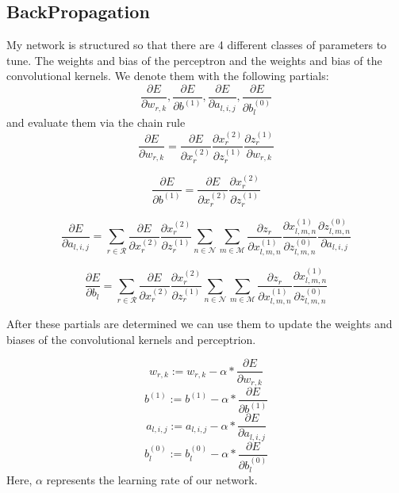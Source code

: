 \documentclass{article}
\begin{document}
\subsection{BackPropagation}
My network is structured so that there are 4 different classes of parameters to tune.  The weights and bias of the perceptron and the weights and bias of the convolutional kernels.  We denote them with the following partials:
\begin{equation}
\frac{\partial E}{\partial w_{r,k}},
\frac{\partial E}{\partial b^{(1)}},
\frac{\partial E}{\partial a_{l,i,j}},
\frac{\partial E}{\partial b^{(0)}_{l}}
\end{equation} 
and evaluate them via the chain rule
\begin{equation}
\frac{\partial E}{\partial w_{r,k}} =
\frac{\partial E}{\partial x_{r}^{(2)}}
\frac{\partial x^{(2)}_{r}}{\partial z_{r}^{(1)}}
\frac{\partial z_{r}^{(1)}}{\partial w_{r,k}}
\end{equation}

\begin{equation}
\frac{\partial E}{\partial b^{(1)}} =
\frac{\partial E}{\partial x_{r}^{(2)}}
\frac{\partial x^{(2)}_{r}}{\partial z_{r}^{(1)}}
\end{equation}

\begin{equation}
\frac{\partial E}{\partial a_{l,i,j}} = 
\sum_{r\in \mathcal{R}}
\frac{\partial E}{\partial x_{r}^{(2)}}
\frac{\partial x_{r}^{(2)}}{\partial z_{r}^{(1)}}
\sum_{n\in \mathcal{N}}
\sum_{m\in \mathcal{M}}
\frac{\partial z_{r}}{\partial x^{(1)}_{l,m,n}}
\frac{\partial x^{(1)}_{l,m,n}}{\partial z^{(0)}_{l,m,n}}
\frac{\partial z_{l,m,n}^{(0)}}{ \partial a_{l,i,j}}
\end{equation}

\begin{equation}
\frac{\partial E}{\partial b_{l}} = 
\sum_{r\in \mathcal{R}}
\frac{\partial E}{\partial x_{r}^{(2)}}
\frac{\partial x_{r}^{(2)}}{\partial z_{r}^{(1)}}
\sum_{n\in \mathcal{N}}
\sum_{m\in \mathcal{M}}
\frac{\partial z_{r}}{\partial x^{(1)}_{l,m,n}}
\frac{\partial x^{(1)}_{l,m,n}}{\partial z^{(0)}_{l,m,n}}
\end{equation}

After these partials are determined we can use them to update the weights and biases of the convolutional kernels and perceptrion. 

\begin{equation}
w_{r,k} := w_{r,k}- \alpha * \frac{\partial E}{\partial w_{r,k}}
\end{equation}
\begin{equation}
b^{(1)} := b^{(1)} - \alpha* \frac{\partial E}{\partial b^{(1)}}
\end{equation}
\begin{equation}
a_{l,i,j} := a_{l,i,j} - \alpha*\frac{\partial E}{\partial a_{l,i,j}}
\end{equation}
\begin{equation}
b^{(0)}_{l} := b^{(0)}_{l} - \alpha*\frac{\partial E}{\partial b^{(0)}_{l}}
\end{equation}
Here, $\alpha$ represents the learning rate of our network.
\end{document}
